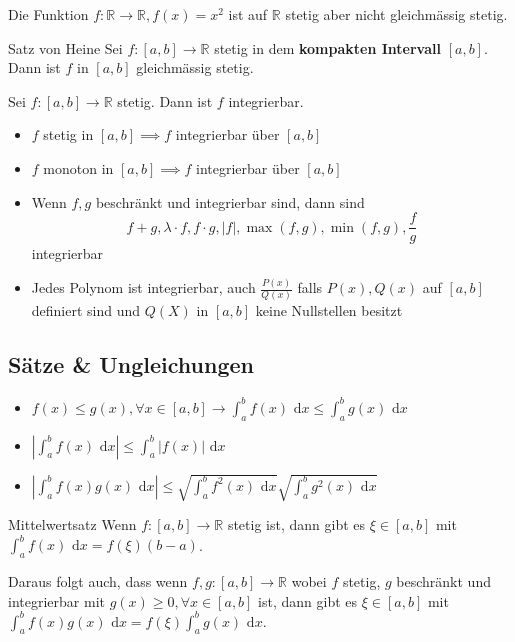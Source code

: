 \documentclass[a4paper,fontsize = 7pt]{scrartcl}
\def\R{\mathbb{R}}
\def\dx{\text{ d}x}
\begin{document}
  Die Funktion $f: \R \to \R, f(x) = x^2$ ist auf $\R$ stetig aber nicht gleichmässig stetig.
\begin{subbox}{Satz von Heine}
  \vspace{-4pt}
  Sei $f: [a,b] \to \R$ stetig in dem \textbf{kompakten Intervall} $[a,b]$. Dann ist $f$ in $[a,b]$ gleichmässig stetig.
  \vspace{-4pt}
\end{subbox}

\begin{mainbox}{}
  \vspace{-4pt}
  Sei $f: [a, b] \to \R$ stetig. Dann ist $f$ integrierbar.
  \vspace{-4pt}
\end{mainbox}

\begin{itemize}
 \item $f$ stetig in $[a,b] \implies f$ integrierbar über $[a,b]$
 \item $f$ monoton in $[a,b] \implies f$ integrierbar über $[a,b]$
 \item Wenn $f,g$ beschränkt und integrierbar sind, dann sind
 $$f+g, \lambda \cdot f, f \cdot g, |f|, \max(f,g), \min(f,g), \frac{f}{g}$$ integrierbar
 \item Jedes Polynom ist integrierbar, auch $\frac{P(x)}{Q(x)}$ falls $P(x), Q(x)$ auf $[a,b]$ definiert sind und $Q(X)$ in $[a,b]$ keine Nullstellen besitzt
\end{itemize}


\subsection{Sätze \& Ungleichungen}
\begin{itemize}
 \item $f(x) \le g(x), \forall x \in [a,b] \rightarrow \int_a^b f(x) \dx \le \int_a^b g(x) \dx$
 \item $\left|\int_a^b f(x) \dx\right| \le \int_a^b |f(x)| \dx$
 \item $\left|\int_a^b f(x) g(x) \dx \right| \le \sqrt{\int_a^b f^2(x) \dx} \sqrt{\int_a^b g^2(x) \dx}$
\end{itemize}

\begin{mainbox}{Mittelwertsatz}
  \vspace{-4pt}
 Wenn $f: [a,b] \to \R$ stetig ist, dann gibt es $\xi \in [a,b]$ mit $\int_a^b f(x) \dx = f(\xi) (b-a)$.
 \vspace{-4pt}
\end{mainbox}
Daraus folgt auch, dass wenn $f,g: [a,b] \to \R$ wobei $f$ stetig, $g$ beschränkt und integrierbar mit $g(x) \ge 0, \forall x \in [a,b]$ ist, dann gibt es $\xi \in [a,b]$ mit $\int_a^b f(x)g(x) \dx = f(\xi) \int_a^b g(x) \dx$.
\end{document}
